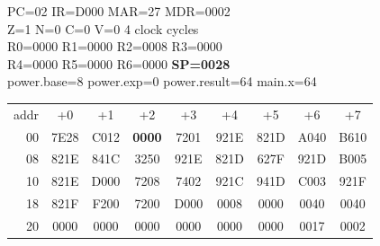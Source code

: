 \begin{tcolorbox}[stepbox, title={Step 41 \hfill PC 1B \quad RET}]
PC=02 IR=D000 MAR=27 MDR=0002\\
Z=1 N=0 C=0 V=0 \hfill \textcolor{dim}{4 clock cycles}\\
R0=0000 R1=0000 R2=0008 R3=0000\\
R4=0000 R5=0000 R6=0000 \textcolor{wrt}{\textbf{SP=0028}}\\
\textcolor{dim}{power.base=8  power.exp=0  power.result=64  main.x=64}\\[1pt]
{\setlength{\tabcolsep}{1.6pt}\begin{tabular}{@{}r*{8}{c}@{}}
\textcolor{dim}{addr} & \textcolor{dim}{+0} & \textcolor{dim}{+1} & \textcolor{dim}{+2} & \textcolor{dim}{+3} & \textcolor{dim}{+4} & \textcolor{dim}{+5} & \textcolor{dim}{+6} & \textcolor{dim}{+7}\\
\textcolor{dim}{00} & 7E28 & C012 & \cellcolor{pcc}\textbf{0000} & 7201 & 921E & 821D & A040 & B610\\
\textcolor{dim}{08} & 821E & 841C & 3250 & 921E & 821D & 627F & 921D & B005\\
\textcolor{dim}{10} & 821E & D000 & 7208 & 7402 & 921C & 941D & C003 & 921F\\
\textcolor{dim}{18} & 821F & F200 & 7200 & D000 & \cellcolor{datac}0008 & \cellcolor{datac}0000 & \cellcolor{datac}0040 & \cellcolor{datac}0040\\
\textcolor{dim}{20} & \cellcolor{stackc}0000 & \cellcolor{stackc}0000 & \cellcolor{stackc}0000 & \cellcolor{stackc}0000 & \cellcolor{stackc}0000 & \cellcolor{stackc}0000 & \cellcolor{stackc}0017 & \cellcolor{stackc}0002\\
\end{tabular}}
\end{tcolorbox}\par\vspace{3pt}
